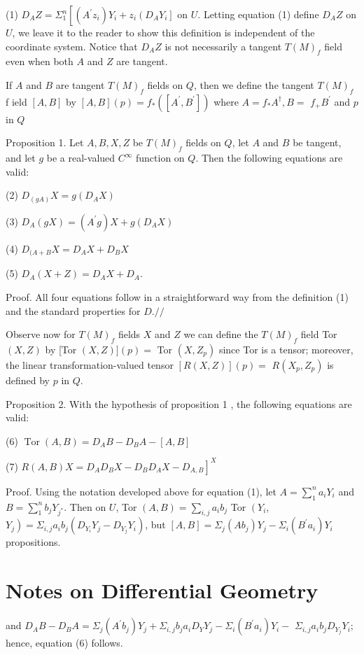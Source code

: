 \documentclass[10pt]{article}
\begin{document}
(1) $D_{A} Z=\Sigma_{1}^{n}\left[\left(A^{\prime} z_{i}\right) Y_{i}+z_{i}\left(D_{A} Y_{i}\right]\right.$ on $U$. Letting equation (1) define $D_{A} Z$ on $U$, we leave it to the reader to show this definition is independent of the coordinate system. Notice that $D_{A} Z$ is not necessarily a tangent $T(M)_{f}$ field even when both $A$ and $Z$ are tangent.

If $A$ and $B$ are tangent $T(M)_{f}$ fields on $Q$, then we define the tangent $T(M)_{f}$ f ield $[A, B]$ by $[A, B](p)=f_{*}\left(\left[A^{\prime}, B^{\prime}\right]\right)$ where $A=f_{*} A^{\dagger}, B=$ $f_{+} B^{\prime}$ and $p$ in $Q$

Proposition 1. Let $A, B, X, Z$ be $T(M)_{f}$ fields on $Q$, let $A$ and $B$ be tangent, and let $g$ be a real-valued $C^{\infty}$ function on $Q$. Then the following equations are valid:

(2) $D_{(g A)} X=g\left(D_{A} X\right)$

(3) $D_{A}(g X)=\left(A^{\prime} g\right) X+g\left(D_{A} X\right)$

(4) $D_{(A+B} X=D_{A} X+D_{B} X$

(5) $D_{A}(X+Z)=D_{A} X+D_{A}$.

Proof. All four equations follow in a straightforward way from the definition (1) and the standard properties for $D . / /$

Observe now for $T(M)_{f}$ fields $X$ and $Z$ we can define the $T(M)_{f}$ field Tor $(X, Z)$ by [Tor $(X, Z)](p)=$ Tor $\left(X, Z_{p}\right)$ since Tor is a tensor; moreover, the linear transformation-valued tensor $[R(X, Z)](p)=$ $R\left(X_{p}, Z_{p}\right)$ is defined by $p$ in $Q .$

Proposition 2. With the hypothesis of proposition 1 , the following equations are valid:

(6) $\operatorname{Tor}(A, B)=D_{A} B-D_{B} A-[A, B]$

(7) $\left.R(A, B) X=D_{A} D_{B} X-D_{B} D_{A} X-D_{A, B}\right]^{X}$

Proof. Using the notation developed above for equation (1), let $A=\sum_{1}^{n} a_{i} Y_{i}$ and $B=\sum_{1}^{n} b_{j} Y_{j^{*}}$. Then on $U$, Tor $(A, B)=\sum_{i, j} a_{i} b_{j}$ Tor $\left(Y_{i}\right.$, $\left.Y_{j}\right)=\Sigma_{i, j} a_{i} b_{j}\left(D_{Y_{i}} Y_{j}-D_{Y_{j}} Y_{i}\right)$, but $[A, B]=\Sigma_{j}\left(A b_{j}\right) Y_{j}-\Sigma_{i}\left(B^{\prime} a_{i}\right) Y_{i}$ propositions.

\section{Notes on Differential Geometry}
and $D_{A} B-D_{B} A=\Sigma_{j}\left(A^{\prime} b_{j}\right) Y_{j}+\Sigma_{i, j} b_{j} a_{i} D_{Y} Y_{j}-\Sigma_{i}\left(B^{\prime} a_{i}\right) Y_{i}-$ $\Sigma_{i, j} a_{i} b_{j} D_{Y_{j}} Y_{i}$; hence, equation (6) follows.
\end{document}
